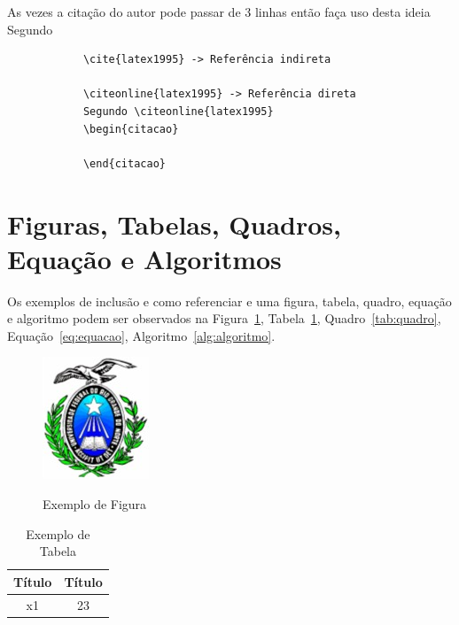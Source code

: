         As vezes a citação do autor pode passar de 3 linhas então faça uso desta ideia 
        Segundo 
            \begin{citacao}
                \lipsum[59]
            \end{citacao}
        
        \begin{verbatim}
            \cite{latex1995} -> Referência indireta
            
            \citeonline{latex1995} -> Referência direta            
            Segundo \citeonline{latex1995}
            \begin{citacao}
                
            \end{citacao}
        \end{verbatim}

    \section{Figuras, Tabelas, Quadros, Equação e Algoritmos}        
    Os exemplos de inclusão e como referenciar e uma figura, tabela, quadro, equação e algoritmo podem ser observados na Figura~\ref{fig:figura}, Tabela~\ref{tab:tabela}, Quadro~\ref{tab:quadro}, Equação~\ref{eq:equacao}, Algoritmo~\ref{alg:algoritmo}.
    
    \begin{figure}[h]
        \centering
        \caption{Exemplo de Figura}
        \includegraphics{lib/Logoufrn.jpg}
        \label{fig:figura}
    \end{figure}
    
    \begin{table}[h]
        \centering
        \caption{Exemplo de Tabela}
        \begin{tabular}{|c|c|}
            \hline
            \textbf{Título} & \textbf{Título}  \\ \hline %
            x1 & 23 \\ \hline 
        \end{tabular}
        \label{tab:tabela}
    \end{table}
    
